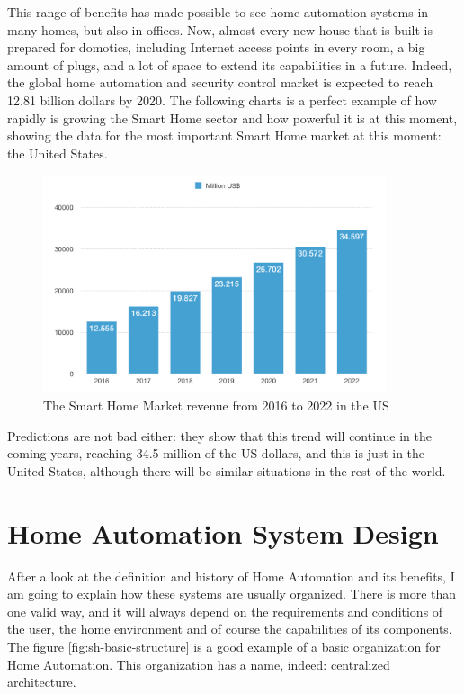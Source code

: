 \bigskip
This range of benefits has made possible to see home automation systems in many homes, but also in offices. Now, almost 
every new house that is built is prepared for domotics, including Internet access points in every room, a big amount of plugs, 
and a lot of space to extend its capabilities in a future. Indeed, the global home automation and security control market is 
expected to reach 12.81 billion dollars by 2020.\cite{reutersResearchMarkets} The following charts is a perfect example of how 
rapidly is growing the Smart Home sector and how powerful it is at this moment, showing the data for the most important Smart
Home market at this moment: the United States.

\begin{figure}
	\centering
	\includegraphics[width=0.9\textwidth]{images/Chapter_02/sh-market-revenue.png}
	\caption{The Smart Home Market revenue from 2016 to 2022 in the US\cite{statistaSmartHomeUS}}
	\label{fig:sh-market-revenue}
\end{figure}

\bigskip
Predictions are not bad either: they show that this trend will continue in the coming years, reaching 34.5 million of the 
US dollars, and this is just in the United States, although there will be similar situations in the rest of the world.

\section{Home Automation System Design}
After a look at the definition and history of Home Automation and its benefits, I am going to explain how these systems are 
usually organized. There is more than one valid way, and it will always depend on the requirements and conditions of the user,
the home environment and of course the capabilities of its components. The figure \ref{fig:sh-basic-structure} is a good 
example of a basic organization for Home Automation\cite{embeddedHASystemDesign}. This organization has a name, indeed:
centralized architecture.

